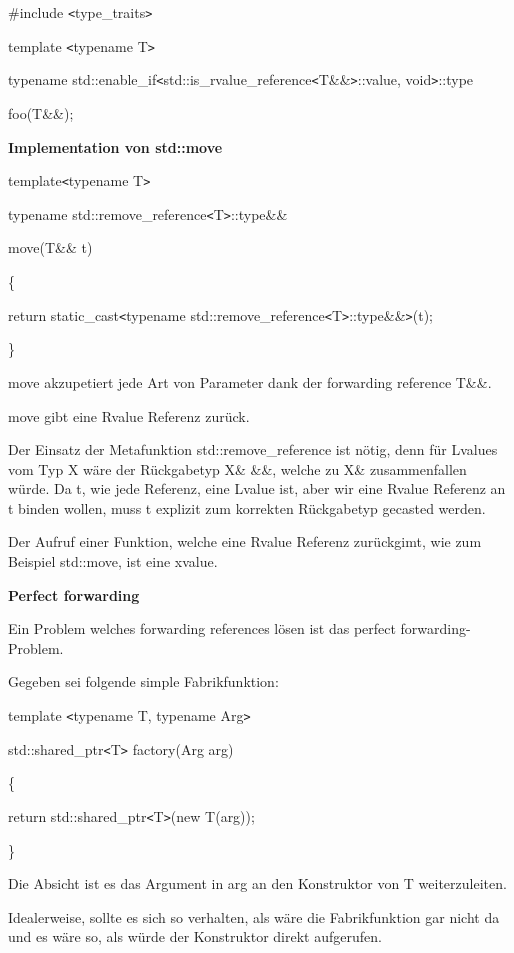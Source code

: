 \documentclass{article}
\begin{document}
\#include \texttt{<}type\_traits\texttt{>}

template \texttt{<}typename T\texttt{>}

typename std::enable\_if\texttt{<}std::is\_rvalue\_reference\texttt{<}T\&\&\texttt{>}::value, 
void\texttt{>}::type

foo(T\&\&);

\vspace{12pt}
\textbf{Implementation von std::move}

template\texttt{<}typename T\texttt{>}

typename std::remove\_reference\texttt{<}T\texttt{>}::type\&\&

move(T\&\& t)

\{    

\parindent=14pt
return static\_cast\texttt{<}typename std::remove\_reference\texttt{<}T\texttt{>}::type\&\&\texttt{>}(t);

\parindent=0pt
\}

move akzupetiert jede Art von Parameter dank der forwarding reference T\&\&.

move gibt eine Rvalue Referenz zurück.

Der Einsatz der Metafunktion std::remove\_reference ist nötig, denn für Lvalues 
vom Typ X wäre der Rückgabetyp X\& \&\&, welche zu X\& zusammenfallen würde. 
Da t, wie jede Referenz, eine Lvalue ist, aber wir eine Rvalue Referenz an t binden 
wollen, muss t explizit zum korrekten Rückgabetyp gecasted werden. 

Der Aufruf einer Funktion, welche eine Rvalue Referenz zurückgimt, wie zum Beispiel 
std::move, ist eine xvalue.

\vspace{12pt}
\textbf{Perfect forwarding}

Ein Problem welches forwarding references lösen ist das perfect forwarding-Problem.

Gegeben sei folgende simple Fabrikfunktion:

template \texttt{<}typename T, typename Arg\texttt{>}

std::shared\_ptr\texttt{<}T\texttt{>} factory(Arg arg)

\{    

\parindent=14pt
return std::shared\_ptr\texttt{<}T\texttt{>}(new T(arg));

\parindent=0pt
\}

Die Absicht ist es das Argument in arg an den Konstruktor von T weiterzuleiten.

Idealerweise, sollte es sich so verhalten, als wäre die Fabrikfunktion gar nicht 
da und es wäre so, als würde der Konstruktor direkt aufgerufen.
\end{document}
